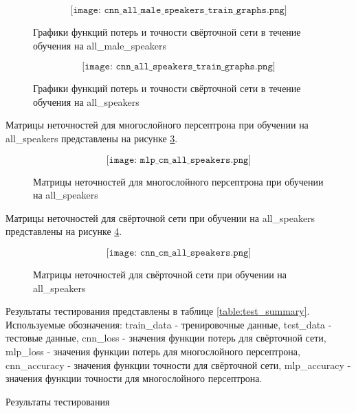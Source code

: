 \begin{figure}[H]
	\[\texttt{[image: cnn\_all\_male\_speakers\_train\_graphs.png]}\]
	\caption{Графики функций потерь и точности свёрточной сети в течение обучения на all\_male\_speakers}
	\label{fig:cnn_all_male_speakers_train_graphs}
\end{figure}

\begin{figure}[H]
	\[\texttt{[image: cnn\_all\_speakers\_train\_graphs.png]}\]
	\caption{Графики функций потерь и точности свёрточной сети в течение обучения на all\_speakers}
	\label{fig:cnn_all_speakers_train_graphs}
\end{figure}

\newpage
Матрицы неточностей для многослойного персептрона при обучении на all\_speakers представлены на рисунке \ref{fig:mlp_cm_all_speakers}.

\begin{figure}[H]
	\[\texttt{[image: mlp\_cm\_all\_speakers.png]}\]
	\caption{Матрицы неточностей для многослойного персептрона при обучении на all\_speakers}
	\label{fig:mlp_cm_all_speakers}
\end{figure}

\newpage
Матрицы неточностей для свёрточной сети при обучении на all\_speakers представлены на рисунке \ref{fig:cnn_cm_all_speakers}.

\begin{figure}[H]
	\[\texttt{[image: cnn\_cm\_all\_speakers.png]}\]
	\caption{Матрицы неточностей для свёрточной сети при обучении на all\_speakers}
	\label{fig:cnn_cm_all_speakers}
\end{figure}

\newpage
Результаты тестирования представлены в таблице \ref{table:test_summary}. Используемые обозначения: train\_data - тренировочные данные, test\_data - тестовые данные, cnn\_loss - значения функции потерь для свёрточной сети, mlp\_loss - значения функции потерь для многослойного персептрона, cnn\_accuracy - значения функции точности для свёрточной сети, mlp\_accuracy - значения функции точности для многослойного персептрона.

\begin{table}[H]
\small
\centering
{}
\caption{Результаты тестирования}
\label{table:test_summary}
\end{table}